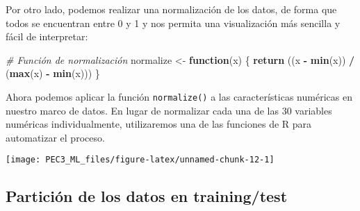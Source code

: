 \documentclass[
]{article}
\newenvironment{Shaded}{\begin{snugshade}}{\end{snugshade}}
\newcommand{\CommentTok}[1]{\textcolor[rgb]{0.56,0.35,0.01}{\textit{#1}}}
\newcommand{\ControlFlowTok}[1]{\textcolor[rgb]{0.13,0.29,0.53}{\textbf{#1}}}
\newcommand{\DataTypeTok}[1]{\textcolor[rgb]{0.13,0.29,0.53}{#1}}
\newcommand{\DecValTok}[1]{\textcolor[rgb]{0.00,0.00,0.81}{#1}}
\newcommand{\FloatTok}[1]{\textcolor[rgb]{0.00,0.00,0.81}{#1}}
\newcommand{\KeywordTok}[1]{\textcolor[rgb]{0.13,0.29,0.53}{\textbf{#1}}}
\newcommand{\NormalTok}[1]{#1}
\newcommand{\OperatorTok}[1]{\textcolor[rgb]{0.81,0.36,0.00}{\textbf{#1}}}
\newcommand{\StringTok}[1]{\textcolor[rgb]{0.31,0.60,0.02}{#1}}
\begin{document}
Por otro lado, podemos realizar una normalización de los datos, de forma
que todos se encuentran entre 0 y 1 y nos permita una visualización más
sencilla y fácil de interpretar:

\begin{Shaded}
\begin{Highlighting}[]
\CommentTok{# Función de normalización}
\NormalTok{normalize <-}\StringTok{ }\ControlFlowTok{function}\NormalTok{(x) \{}
  \KeywordTok{return}\NormalTok{ ((x }\OperatorTok{-}\StringTok{ }\KeywordTok{min}\NormalTok{(x)) }\OperatorTok{/}\StringTok{ }\NormalTok{(}\KeywordTok{max}\NormalTok{(x) }\OperatorTok{-}\StringTok{ }\KeywordTok{min}\NormalTok{(x)))}
\NormalTok{\}}
\end{Highlighting}
\end{Shaded}

Ahora podemos aplicar la función \texttt{normalize()} a las
características numéricas en nuestro marco de datos. En lugar de
normalizar cada una de las 30 variables numéricas individualmente,
utilizaremos una de las funciones de R para automatizar el proceso.

\begin{Shaded}
\end{Shaded}

\begin{center}\texttt{[image: PEC3\_ML\_files/figure-latex/unnamed-chunk-12-1]} \end{center}

\hypertarget{particiuxf3n-de-los-datos-en-trainingtest}{%
\subsection{Partición de los datos en
training/test}\label{particiuxf3n-de-los-datos-en-trainingtest}}
\end{document}
